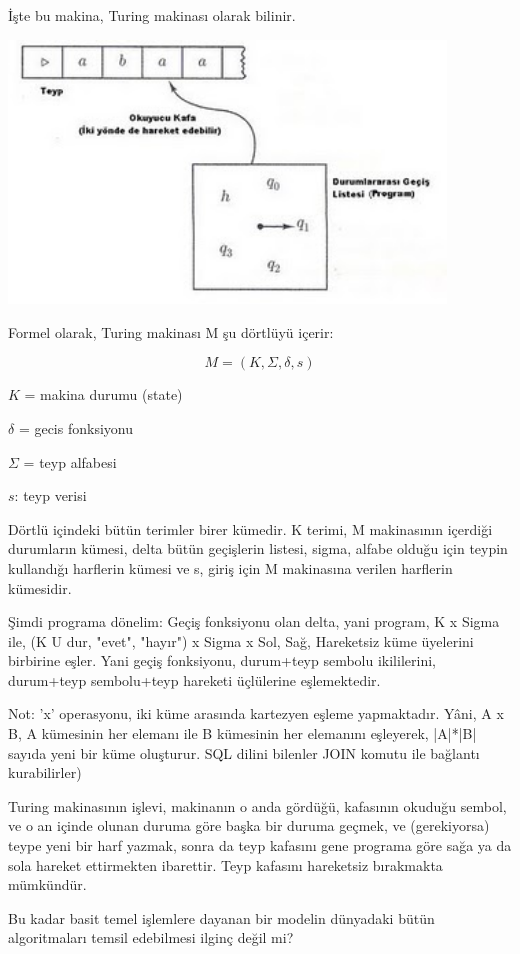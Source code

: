 \documentclass[12pt,fleqn]{article}\usepackage{../../common}
\begin{document}
İşte bu makina, Turing makinası olarak bilinir.

\includegraphics[height=7cm]{turing_makinasi.jpg}

Formel olarak, Turing makinası M şu dörtlüyü içerir: 

$$ M = (K,\Sigma,\delta, s) $$

$K$ = makina durumu (state)

$\delta$ = gecis fonksiyonu 

$\Sigma$ = teyp alfabesi 

$s$: teyp verisi 

Dörtlü içindeki bütün terimler birer kümedir. K terimi, M makinasının içerdiği
durumların kümesi, delta bütün geçişlerin listesi, sigma, alfabe olduğu için
teypin kullandığı harflerin kümesi ve s, giriş için M makinasına verilen
harflerin kümesidir.

Şimdi programa dönelim: Geçiş fonksiyonu olan delta, yani program, K x Sigma
ile, (K U {dur, "evet", "hayır"}) x Sigma x {Sol, Sağ, Hareketsiz} küme
üyelerini birbirine eşler. Yani geçiş fonksiyonu, durum+teyp sembolu
ikililerini, durum+teyp sembolu+teyp hareketi üçlülerine eşlemektedir.

Not: 'x' operasyonu, iki küme arasında kartezyen eşleme yapmaktadır. Yâni,
A x B, A kümesinin her elemanı ile B kümesinin her elemanını eşleyerek,
|A|*|B| sayıda yeni bir küme oluşturur. SQL dilini bilenler JOIN komutu ile
bağlantı kurabilirler)

Turing makinasının işlevi, makinanın o anda gördüğü, kafasının okuduğu sembol,
ve o an içinde olunan duruma göre başka bir duruma geçmek, ve (gerekiyorsa)
teype yeni bir harf yazmak, sonra da teyp kafasını gene programa göre sağa ya da
sola hareket ettirmekten ibarettir. Teyp kafasını hareketsiz bırakmakta
mümkündür.

Bu kadar basit temel işlemlere dayanan bir modelin dünyadaki bütün
algoritmaları temsil edebilmesi ilginç değil mi?
\end{document}
